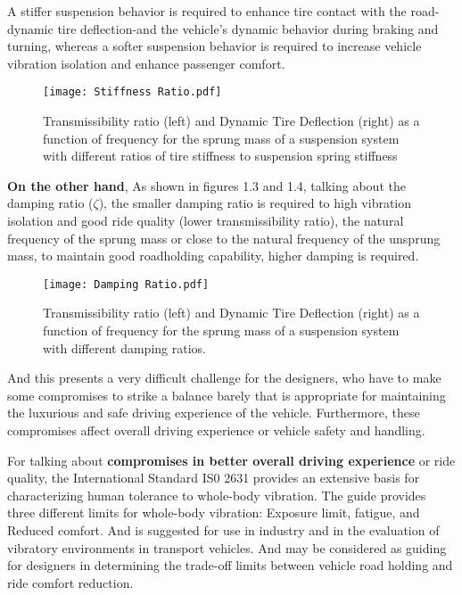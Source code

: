 A stiffer suspension behavior is required to enhance tire contact with the road-dynamic tire deflection-and the vehicle's dynamic behavior during braking and turning, whereas a softer suspension behavior is required to increase vehicle vibration isolation and enhance passenger comfort. \cite{east2021experimental}

\begin{figure}[H]
\centering
\texttt{[image: Stiffness Ratio.pdf]}
\caption{Transmissibility ratio (left) and Dynamic Tire Deflection (right) as a function of frequency for the sprung mass of a suspension system with different ratios of tire stiffness to suspension spring stiffness}
\label{fig:1.1}
\end{figure}

\textbf{On the other hand}, As shown in figures 1.3 and 1.4, talking about the damping ratio ($\zeta$), the smaller damping ratio is required to high vibration isolation and good ride quality (lower transmissibility ratio), the natural frequency of the sprung mass or close to the natural frequency of the unsprung mass, to maintain good roadholding capability, higher damping is required. \cite{wong2001theory}

\begin{figure}[H]
\centering
\texttt{[image: Damping Ratio.pdf]}
\caption{Transmissibility ratio (left) and Dynamic Tire Deflection (right) as a function of frequency for the sprung mass of a suspension system with different damping ratios.}
\label{fig:1.2}
\end{figure}

And this presents a very difficult challenge for the designers, who have to make some compromises to strike a balance barely that is appropriate for maintaining the luxurious and safe driving experience of the vehicle. Furthermore, these compromises affect overall driving experience or vehicle safety and handling. \cite{east2021experimental}

For talking about \textbf{compromises in better overall driving experience} or ride quality, the International Standard IS0 2631 provides an extensive basis for characterizing human tolerance to whole-body vibration. The guide provides three different limits for whole-body vibration: Exposure limit, fatigue, and Reduced comfort. And is suggested for use in industry and in the evaluation of vibratory environments in transport vehicles. And may be considered as guiding for designers in determining the trade-off limits between vehicle road holding and ride comfort reduction. \cite{oborne1983whole}

